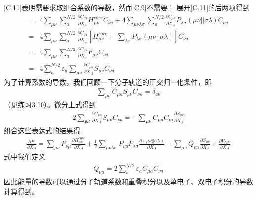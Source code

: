 \autoref{C.11}表明需要求取组合系数的导数，然而\autoref{C.9}不需要！
展开\autoref{C.11}的后两项得到
\begin{align}
	\nonumber
	=&4\sum_{\mu \nu}\sum_{a}^{N/2}\frac{\partial C_{\mu a}}{\partial X_A}H_{\mu \nu}^{core}C_{\nu a}
		+4\sum_{\mu \nu\lambda \sigma }\sum_{a}^{N/2}\frac{\partial C_{\mu a}}{\partial X_A}  P_{\lambda \sigma}(\mu \nu|| \sigma\lambda)  C_{\nu a}
	\\ \nonumber
	=&4\sum_{\mu \nu}\sum_{a}^{N/2}\frac{\partial C_{\mu a}}{\partial X_A}
		[H_{\mu \nu}^{core}-\sum_{\lambda \sigma } P_{\lambda \sigma}(\mu \nu|| \sigma\lambda)]C_{\nu a}
	\\ \nonumber
	=&4\sum_{\mu \nu}\sum_{a}^{N/2}\frac{\partial C_{\mu a}}{\partial X_A}F_{\mu \nu}C_{\nu a}
	\\ \nonumber
	=&4\sum_{a}^{N/2}	\varepsilon_a \sum_{\mu \nu}\frac{\partial C_{\mu a}}{\partial X_A}S_{\mu \nu}C_{\nu a}
\end{align}
为了计算系数的导数，我们回顾一下分子轨道的正交归一化条件，即
\begin{align}
	\nonumber
	\sum_{\mu \nu}C_{\mu a}S_{\mu \nu}C_{\nu a}=\delta_{ab} 
\end{align}
（见练习3.10）。微分上式得到
\begin{align}
	\nonumber
	2\sum_{\mu \nu}\frac{\partial C_{\mu a}}{\partial X_A}S_{\mu \nu}C_{\nu a}
	=-\sum_{\mu \nu}C_{\mu a}C_{\nu a}\frac{\partial S_{\mu \nu}}{\partial X_A}
\end{align}
组合这些表达式的结果得
\begin{align}
	\label{C.12}
    \frac{\partial E}{\partial X_A}=
    \sum_{\mu \nu}P_{\nu \mu}\frac{\partial H_{\mu \nu}^{core}}{\partial X_A}
    +\frac{1}{2}\sum_{\mu \nu\lambda \sigma }P_{\nu \mu}P_{\lambda \sigma}
      \frac{\partial (\mu \nu|| \sigma\lambda)}{\partial X_A}
    -\sum_{\mu \nu}Q_{\nu \mu} \frac{\partial S_{\mu \nu}}{\partial X_A}
    +\frac{\partial V_{NN}}{\partial X_A}
\end{align}
式中我们定义
\begin{align}
	\nonumber
    Q_{\nu \mu}=2\sum_{a}^{N/2}\varepsilon_a C_{\mu a}C_{\nu a}
\end{align}
因此能量的导数可以通过分子轨道系数和重叠积分以及单电子、双电子积分的导数计算得到。

